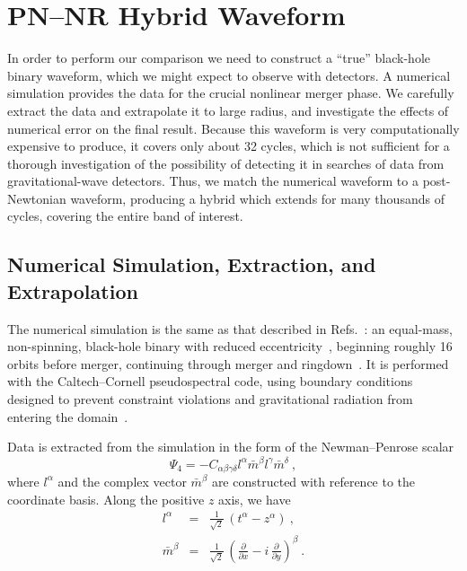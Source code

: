 \section{PN--NR Hybrid Waveform}
\label{sec:PNNRHybridWaveform} %


In order to perform our comparison we need to construct a ``true''
black-hole binary waveform, which we might expect to observe with
detectors.  A numerical simulation provides the data for the crucial
nonlinear merger phase.  We carefully extract the data and extrapolate
it to large radius, and investigate the effects of numerical error on
the final result.  Because this waveform is very computationally
expensive to produce, it covers only about 32 cycles, which is not
sufficient for a thorough investigation of the possibility of
detecting it in searches of data from gravitational-wave detectors.
Thus, we match the numerical waveform to a post-Newtonian waveform,
producing a hybrid which extends for many thousands of cycles,
covering the entire band of interest.

\subsection{Numerical Simulation, Extraction, and Extrapolation}
\label{sec:WaveformExtractionAndExtrapolation}
The numerical simulation is the same as that described in
Refs.~\cite{Boyle2007, Scheel2008}: an equal-mass, non-spinning,
black-hole binary with reduced
eccentricity~\cite{Pfeiffer-Brown-etal:2007}, beginning roughly 16
orbits before merger, continuing through merger and
ringdown~\cite{Scheel2008}.  It is performed with the Caltech--Cornell
pseudospectral code, using boundary conditions designed to prevent
constraint violations and gravitational radiation from entering the
domain~\cite{Holst2004, Lindblom2006}.

Data is extracted from the simulation in the form of the
Newman--Penrose scalar
\begin{equation}
  \Psi_{4} = -C_{\alpha \beta \gamma \delta} l^{\alpha}
  \bar{m}^{\beta} l^{\gamma} \bar{m}^{\delta}\ ,
\end{equation}
where $l^{\alpha}$ and the complex vector $\bar{m}^{\beta}$ are
constructed with reference to the coordinate basis.  Along the
positive $z$ axis, we have
\begin{eqnarray}
  l^{\alpha} &= & \frac{1}{\sqrt{2}}\, \left( t^{\alpha} - z^{\alpha}
  \right)\ , \\
  \bar{m}^{\beta} &= & \frac{1}{\sqrt{2}}\, \left(
    \frac{\partial}{\partial x} - i\, \frac{\partial}{\partial y}
  \right)^{\beta}\ .
\end{eqnarray}

